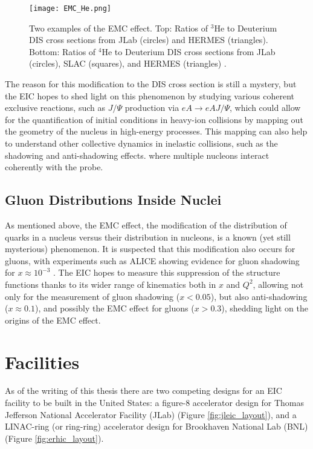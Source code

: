 \begin{figure}[!htb]
	\centering
	\texttt{[image: EMC\_He.png]}
	\caption[Two examples of the EMC effect.]{Two examples of the EMC effect. Top: Ratios of ${}^3$He to Deuterium DIS cross sections from JLab (circles) and HERMES (triangles). Bottom: Ratios of ${}^4$He to Deuterium DIS cross sections from JLab (circles), SLAC (squares), and HERMES (triangles) \cite{EMC_Challenge}.}
	\label{fig:emc_effect}
\end{figure}

The reason for this modification to the DIS cross section is still a mystery, but the EIC hopes to shed light on this phenomenon by studying various coherent exclusive reactions, such as $J/\Psi$ production via $eA \rightarrow eAJ/\Psi$, which could allow for the quantification of initial conditions in heavy-ion collisions by mapping out the geometry of the nucleus in high-energy processes. This mapping can also help to understand other collective dynamics in inelastic collisions, such as the shadowing and anti-shadowing effects. where multiple nucleons interact coherently with the probe.

\subsection{Gluon Distributions Inside Nuclei}
As mentioned above, the EMC effect, the modification of the distribution of quarks in a nucleus versus their distribution in nucleons, is a known (yet still mysterious) phenomenon. It is suspected that this modification also occurs for gluons, with experiments such as ALICE showing evidence for gluon shadowing for $x \approx 10^{-3}$ \cite{ALICE_antishadowing}. The EIC hopes to measure this suppression of the structure functions thanks to its wider range of kinematics both in $x$ and $Q^2$, allowing not only for the measurement of gluon shadowing ($x < 0.05$), but also anti-shadowing ($x \approx 0.1$), and possibly the EMC effect for gluons ($x > 0.3$), shedding light on the origins of the EMC effect.

\section{Facilities}
As of the writing of this thesis there are two competing designs for an EIC facility to be built in the United States: a figure-8 accelerator design for Thomas Jefferson National Accelerator Facility (JLab) (Figure \ref{fig:jleic_layout}), and a LINAC-ring (or ring-ring) accelerator design for Brookhaven National Lab (BNL) (Figure \ref{fig:erhic_layout}).

